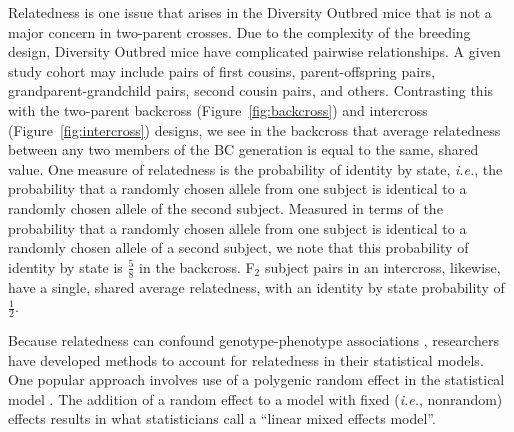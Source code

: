 \documentclass[]{article}\usepackage[]{graphicx}\usepackage[]{color}
\begin{document}
Relatedness is one issue that arises in the Diversity Outbred mice that is not a major concern in 
two-parent crosses. Due to the complexity of the breeding design, Diversity Outbred mice
have 
complicated pairwise relationships. A given study cohort may include pairs of first
cousins, parent-offspring pairs, grandparent-grandchild pairs, second cousin pairs, and others.
Contrasting this with the two-parent backcross (Figure~\ref{fig:backcross}) and
intercross (Figure~\ref{fig:intercross}) designs, we see in the backcross that
average relatedness between any two members of the BC generation is equal to the same, shared value.
One measure of relatedness is the probability of identity by state, \emph{i.e.}, the
probability that a randomly chosen allele from one subject is identical to a randomly chosen
allele of the second subject. Measured in terms of the probability that a randomly chosen allele
from one subject is identical to a randomly chosen allele of a second subject, we note that
this probability of identity by state is $\frac{5}{8}$ in the backcross. F$_2$ subject pairs in an intercross, likewise, have a single, shared average relatedness, with an identity by state probability of $\frac{1}{2}$.

Because relatedness can confound genotype-phenotype associations \citep{yang2014advantages}, researchers have developed methods to account for relatedness in their statistical models. One popular approach involves use of a polygenic random effect in the statistical model \citep{kang2008efficient}. The addition of a random effect to a model with fixed (\emph{i.e.}, nonrandom) effects results in what statisticians call a ``linear mixed effects model''. 







\printbibliography
\end{document}
